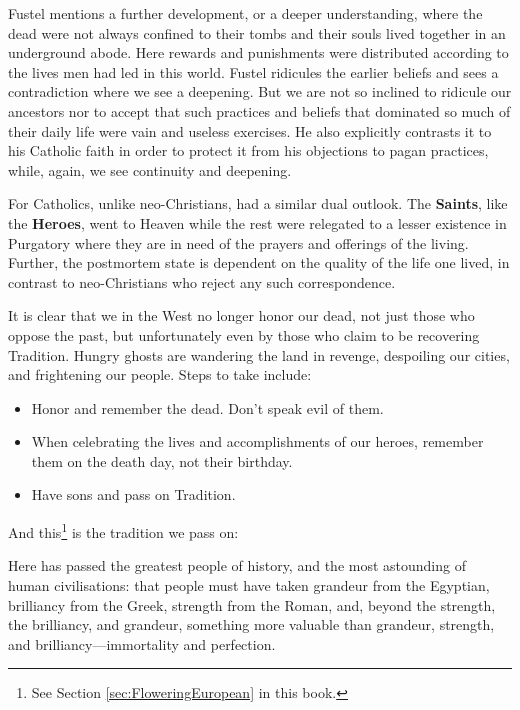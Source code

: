 Fustel mentions a further development, or a deeper understanding, where the dead were not always confined to their tombs and their souls lived together in an underground abode. Here rewards and punishments were distributed according to the lives men had led in this world. Fustel ridicules the earlier beliefs and sees a contradiction where we see a deepening. But we are not so inclined to ridicule our ancestors nor to accept that such practices and beliefs that dominated so much of their daily life were vain and useless exercises. He also explicitly contrasts it to his Catholic faith in order to protect it from his objections to pagan practices, while, again, we see continuity and deepening.

For Catholics, unlike neo-Christians, had a similar dual outlook. The \textbf{Saints}, like the \textbf{Heroes}, went to Heaven while the rest were relegated to a lesser existence in Purgatory where they are in need of the prayers and offerings of the living. Further, the postmortem state is dependent on the quality of the life one lived, in contrast to neo-Christians who reject any such correspondence.

It is clear that we in the West no longer honor our dead, not just those who oppose the past, but unfortunately even by those who claim to be recovering Tradition. Hungry ghosts are wandering the land in revenge, despoiling our cities, and frightening our people. Steps to take include:

\begin{itemize}
\item Honor and remember the dead. Don't speak evil of them. 
\item When celebrating the lives and accomplishments of our heroes, remember them on the death day, not their birthday. 
\item Have sons and pass on Tradition. 
\end{itemize}
And this\footnote{See Section \ref{sec:FloweringEuropean} in this book.} is the tradition we pass on:

\begin{quotex}
Here has passed the greatest people of history, and the most astounding of human civilisations: that people must have taken grandeur from the Egyptian, brilliancy from the Greek, strength from the Roman, and, beyond the strength, the brilliancy, and grandeur, something more valuable than grandeur, strength, and brilliancy—immortality and perfection.


\end{quotex}


